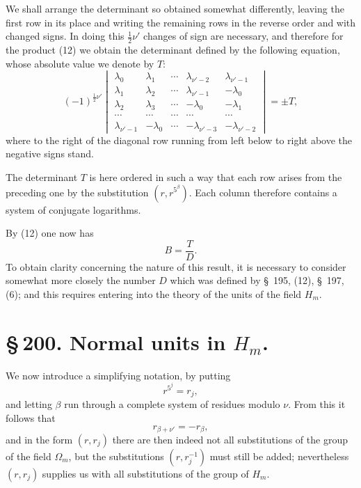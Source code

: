 \documentclass[11pt]{article}
\begin{document}
We shall arrange the determinant so obtained somewhat differently, leaving the first row in its place and writing the
remaining rows in the reverse order and with changed signs. In doing this $\frac12\nu'$ changes of sign are necessary, and therefore for the product (12) we obtain the determinant defined by the following equation, whose absolute value we denote by $T$:
\begin{equation}
(-1)^{\frac12\nu'}
\begin{vmatrix}
\lambda_0&\lambda_1&\cdots&\lambda_{\nu'-2}&\lambda_{\nu'-1}\\
\lambda_1&\lambda_2&\cdots&\lambda_{\nu'-1}&-\lambda_0\\
\lambda_2&\lambda_3&\cdots&-\lambda_0&-\lambda_1\\
\cdots&\cdots&\cdots&\cdots&\cdots\\
\lambda_{\nu'-1}&-\lambda_0&\cdots&-\lambda_{\nu'-3}&-\lambda_{\nu'-2}
\end{vmatrix}=\pm T,
\tag{14}
\end{equation}
where to the right of the diagonal row running from left below to right above the negative signs stand.

The determinant $T$ is here ordered in such a way that each row arises from the preceding one by the substitution $(r,r^{5^\beta})$. Each column therefore contains a system of conjugate logarithms.

By (12) one now has
\begin{equation}
B=\frac{T}{D}.
\tag{15}
\end{equation}
To obtain clarity concerning the nature of this result, it is necessary to consider somewhat more closely the number $D$ which was defined by \S~195, (12), \S~197, (6); and this requires entering into the theory of the units of the field $H_m$.

\clearpage
\section*{\S\,200. Normal units in $H_m$.}

We now introduce a simplifying notation, by putting
\begin{equation}
r^{5^j}=r_j,
\tag{1}
\end{equation}
and letting $\beta$ run through a complete system of residues modulo $\nu$. From this it follows that
\begin{equation}
r_{\beta+\nu'}=-r_\beta,
\tag{2}
\end{equation}
and in the form $(r,r_j)$ there are then indeed not all substitutions of the group of the field $\Omega_m$, but the substitutions $(r,r_j^{-1})$ must still be added; nevertheless $(r,r_j)$ supplies us with all substitutions of the group of $H_m$.
\end{document}

